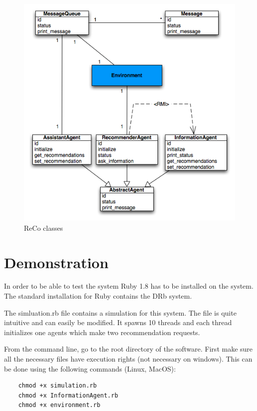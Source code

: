 \documentclass[11pt,a4paper]{article} %
\begin{document}
\begin{figure}
    \begin{center}
        \includegraphics[scale=0.5]{classes}
        \caption{\small{ReCo classes}\label{fig:classes}}
    \end{center}
\end{figure}

\section{Demonstration}

In order to be able to test the system Ruby 1.8 has to be installed on the system. The standard installation for Ruby contains the DRb system.

The simluation.rb file contains a simulation for this system. The file is quite intuitive and can easily be modified. It spawns 10 threads and each thread initializes one agents which make two recommendation requests.

From the command line, go to the root directory of the software. First make sure all the necessary files have execution rights (not necessary on windows). This can be done using the following commands (Linux, MacOS):

\begin{verbatim}
    chmod +x simulation.rb
    chmod +x InformationAgent.rb
    chmod +x environment.rb
\end{verbatim}
\end{document}
